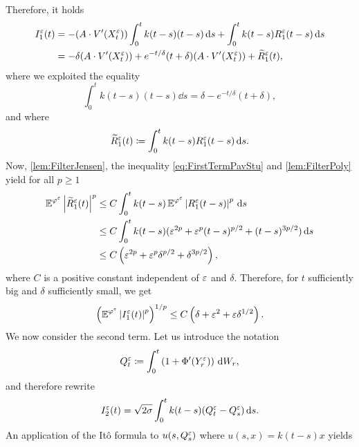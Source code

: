 \documentclass[review,onefignum,onetabnum]{siamonline190516}
\begin{document}
\begin{appendices}
\begin{equation}
	\end{equation}
	Therefore, it holds 
	\begin{equation}\label{eq:Diff_I1}
	\begin{aligned}
	I_1^\epl(t) &= -(A \cdot V'(X_t^\epl)) \int_0^t k(t-s) (t-s)\dd s + \int_0^t k(t-s)R_1^\epl(t-s) \dd s\\
	&= -\delta (A \cdot  V'(X_t^\epl)) + e^{-t/\delta}(t + \delta)(A \cdot V'(X_t^\epl)) + \widetilde R_1^\epl(t),
	\end{aligned}
	\end{equation}
	where we exploited the equality
	\begin{equation}
	\int_0^t k(t-s) (t-s) \dd s = \delta - e^{-t/\delta}(t + \delta),
	\end{equation}
	and where
	\begin{equation}
	\widetilde R_1^\varepsilon(t) \coloneqq \int_0^t k(t-s)R_1^\varepsilon(t-s) \,\mathrm{d} s.
	\end{equation}
	Now, \cref{lem:FilterJensen}, the inequality \eqref{eq:FirstTermPavStu} and \cref{lem:FilterPoly} yield for all $p \geq 1$
	\begin{equation}
	\begin{aligned}
		\operatorname{\mathbb{E}}^{\varphi^\varepsilon}\left\lvert\widetilde R_1^\varepsilon(t)\right\rvert^p &\leq C \int_0^t k(t-s)\operatorname{\mathbb{E}}^{\varphi^\varepsilon} \left\lvert R_1^\varepsilon(t-s)\right\rvert^p \,\mathrm{d} s\\
		&\leq C \int_0^t k(t-s)(\varepsilon^{2p} + \varepsilon^p(t-s)^{p/2}+(t-s)^{3p/2}) \,\mathrm{d} s\\
		&\leq C \left( \varepsilon^{2p} + \varepsilon^p \delta^{p/2} + \delta^{3p/2} \right),
	\end{aligned}
	\end{equation}
	where $C$ is a positive constant independent of $\varepsilon$ and $\delta$. Therefore, for $t$ sufficiently big and $\delta$ sufficiently small, we get
	\begin{equation}
		\left(\operatorname{\mathbb{E}}^{\varphi^\varepsilon}\left\lvert I_1^\varepsilon(t)\right\rvert^{p}\right)^{1/p} \leq C \left( \delta + \varepsilon^2 + \varepsilon \delta^{1/2} \right).
	\end{equation}
	We now consider the second term. Let us introduce the notation  
	\begin{equation}
		Q_t^\varepsilon \coloneqq \int_0^t \left(1 + \Phi'(Y_r^\varepsilon)\right) \,\mathrm{d} W_r,
	\end{equation}
	and therefore rewrite
	\begin{equation}
		I_2^\varepsilon(t) = \sqrt{2\sigma} \int_0^t k(t-s)(Q_t^\varepsilon - Q_s^\varepsilon) \,\mathrm{d} s.
	\end{equation}
	An application of the Itô formula to $u(s, Q_s^\varepsilon)$ where $u(s, x) = k(t-s)x$ yields

\end{appendices}
\end{document}
